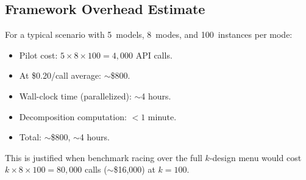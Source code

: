 \subsection{Framework Overhead Estimate}

For a typical scenario with 5~models, 8~modes, and 100~instances per mode:
\begin{itemize}[nosep]
  \item Pilot cost: $5 \times 8 \times 100 = 4{,}000$ API calls.
  \item At \$0.20/call average: $\sim$\$800.
  \item Wall-clock time (parallelized): $\sim$4 hours.
  \item Decomposition computation: $< 1$ minute.
  \item Total: $\sim$\$800, $\sim$4 hours.
\end{itemize}

This is justified when benchmark racing over the full $k$-design menu would cost $k \times 8 \times 100 = 80{,}000$ calls ($\sim$\$16{,}000) at $k = 100$.
